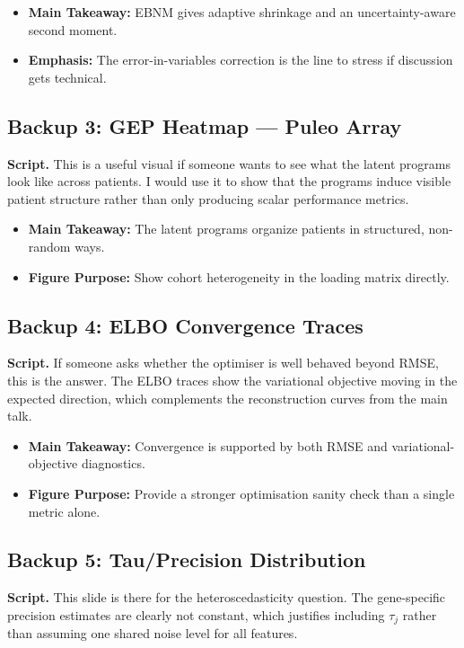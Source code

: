 \documentclass[11pt]{article}
\newcommand{\scriptlabel}{\textbf{Script. }}
\newcommand{\sectionlabel}[1]{\textbf{#1}}
\begin{document}
\begin{itemize}
\item \sectionlabel{Main Takeaway:} EBNM gives adaptive shrinkage and an uncertainty-aware second moment.
\item \sectionlabel{Emphasis:} The error-in-variables correction is the line to stress if discussion gets technical.
\end{itemize}

\subsection*{Backup 3: GEP Heatmap --- Puleo Array}
\scriptlabel This is a useful visual if someone wants to see what the latent programs look like across patients. I would use it to show that the programs induce visible patient structure rather than only producing scalar performance metrics.

\begin{itemize}
\item \sectionlabel{Main Takeaway:} The latent programs organize patients in structured, non-random ways.
\item \sectionlabel{Figure Purpose:} Show cohort heterogeneity in the loading matrix directly.
\end{itemize}

\subsection*{Backup 4: ELBO Convergence Traces}
\scriptlabel If someone asks whether the optimiser is well behaved beyond RMSE, this is the answer. The ELBO traces show the variational objective moving in the expected direction, which complements the reconstruction curves from the main talk.

\begin{itemize}
\item \sectionlabel{Main Takeaway:} Convergence is supported by both RMSE and variational-objective diagnostics.
\item \sectionlabel{Figure Purpose:} Provide a stronger optimisation sanity check than a single metric alone.
\end{itemize}

\subsection*{Backup 5: Tau/Precision Distribution}
\scriptlabel This slide is there for the heteroscedasticity question. The gene-specific precision estimates are clearly not constant, which justifies including $\tau_j$ rather than assuming one shared noise level for all features.
\end{document}
